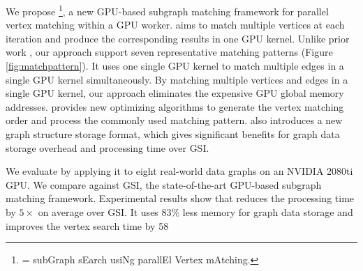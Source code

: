 We propose \SystemName\footnote{\SystemName = subGraph sEarch usiNg parallEl Vertex mAtching.}, a new GPU-based subgraph matching framework
for parallel vertex matching within a GPU worker. \SystemName aims to match multiple vertices at each iteration and produce the
corresponding results in one GPU kernel. Unlike prior work \cite{lai2015scalable}, our approach support seven representative matching
patterns (Figure \ref{fig:matchpattern}). It uses one single GPU kernel to match multiple edges in a single GPU kernel simultaneously. By
matching multiple vertices and edges in a single GPU kernel, our approach eliminates the expensive GPU global memory addresses. \SystemName
provides new optimizing algorithms to generate the vertex matching order and process the commonly used matching pattern. \SystemName also
introduces a new graph structure storage format, which gives significant benefits for graph data storage overhead and processing time over
GSI.

We evaluate \SystemName by applying it to eight real-world data graphs on an NVIDIA 2080ti GPU. We compare \SystemName against GSI, the
state-of-the-art GPU-based subgraph matching framework. Experimental results show that \SystemName reduces the processing time by $5\times$
on average over GSI. It uses 83\% less memory for graph data storage and improves the vertex search time by 58%





